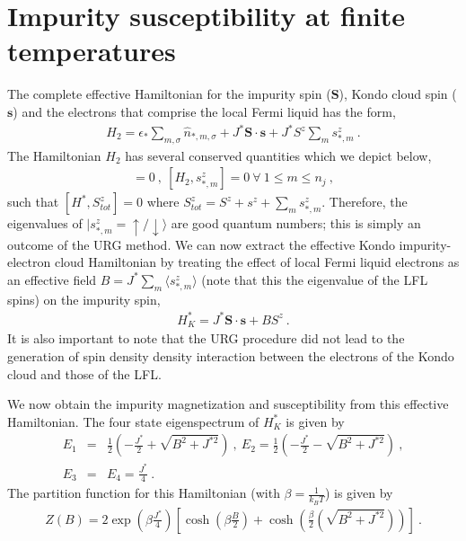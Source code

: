 \documentclass[aps,prb,preprint,groupedaddress]{revtex4-2}
\begin{document}
\section{Impurity susceptibility at finite temperatures}\label{susc1}
The complete effective Hamiltonian for the impurity spin ($\mathbf{S}$), Kondo cloud spin ($\mathbf{s}$) and the electrons that comprise the local Fermi liquid has the form,
\begin{eqnarray}
H_{2}=\epsilon_{*}\sum_{m,\sigma}\hat{n}_{*,m,\sigma}+J^{*}\mathbf{S}\cdot\mathbf{s}+J^{*}S^{z}\sum_{m}s^{z}_{*,m}~.
\end{eqnarray}
The Hamiltonian $H_{2}$ has several conserved quantities which we depict below,
\begin{eqnarray}
[H_{2},S^{z}+s^{z}]=0~,~ [H_{2},s^{z}_{*,m}]=0 ~\forall ~1\leq m\leq n_{j}~,
\end{eqnarray}
such that $[H^{*},S^{z}_{tot}]=0$ where $S^{z}_{tot}=S^{z}+s^{z}+\sum_{m}s^{z}_{*,m}$. Therefore, the eigenvalues of $|s^{z}_{*,m}=\uparrow/\downarrow\rangle$  are good quantum numbers; this is simply an outcome of the URG method. We can now extract the effective Kondo impurity-electron cloud Hamiltonian by treating the effect of local Fermi liquid electrons as an effective field $B=J^{*}\sum_{m}\langle s^{z}_{*,m}\rangle$ (note that this the eigenvalue of the LFL spins) on the impurity spin,
\begin{eqnarray}
H^{*}_{K}=J^{*}\mathbf{S}\cdot\mathbf{s}+BS^{z}~.
\end{eqnarray}
It is also important to note that the URG procedure did not lead to the generation of spin density density interaction between the electrons of the Kondo cloud and those of the LFL.
\par\noindent
We now obtain the impurity magnetization and susceptibility from this effective Hamiltonian. The four state eigenspectrum of $H^{*}_{K}$ is given by
\begin{eqnarray}
E_{1}&=&\frac{1}{2}(-\frac{J^{*}}{2}+\sqrt{B^{2}+J^{*2}})~,~E_{2}=\frac{1}{2}(-\frac{J^{*}}{2}-\sqrt{B^{2}+J^{*2}})~,\nonumber\\
E_{3}&=&E_{4}=\frac{J^{*}}{4}~.
\end{eqnarray}
The partition function for this Hamiltonian (with $\beta=\frac{1}{k_{B}T}$) is given by
\begin{eqnarray}
Z(B)=2\exp(\beta\frac{J^{*}}{4})\left[\cosh(\beta\frac{B}{2})+\cosh(\frac{\beta}{2}(\sqrt{B^{2}+J^{*2}}))\right]~.
\end{eqnarray}
\end{document}
